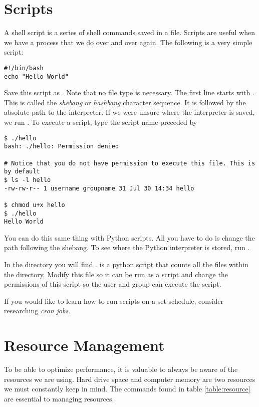 \section*{Scripts}

A shell script is a series of shell commands saved in a file. Scripts are useful when we have a process that we do over and over again. The following is a very simple script:

\begin{lstlisting}
#!/bin/bash
echo "Hello World"
\end{lstlisting}

Save this script as . Note that no file type is necessary. The first line starts with . This is called the \emph{shebang} or \emph{hashbang} character sequence. It is followed by the absolute path to the  interpreter. If we  were unsure where the  interpreter is saved, we run .  To execute a script, type the script name preceded by 

\begin{lstlisting}
$ ./hello
bash: ./hello: Permission denied

# Notice that you do not have permission to execute this file. This is by default
$ ls -l hello
-rw-rw-r-- 1 username groupname 31 Jul 30 14:34 hello

$ chmod u+x hello
$ ./hello   
Hello World
\end{lstlisting}

You can do this same thing with Python scripts. All you have to do is change the path following the shebang. To see where the Python interpreter is stored, run .

\begin{problem}
In the  directory you will find .  is a python script that counts all the files within the  directory. Modify this file so it can be run as a script and change the permissions of this script so the user and group can execute the script.
\end{problem}

If you would like to learn how to run scripts on a set schedule, consider researching \emph{cron jobs}.

\section*{Resource Management}
To be able to optimize performance, it is valuable to always be aware of the resources we are using. Hard drive space and computer memory are two resources we must constantly keep in mind. The commands found in table \ref{table:resource} are essential to managing resources.

